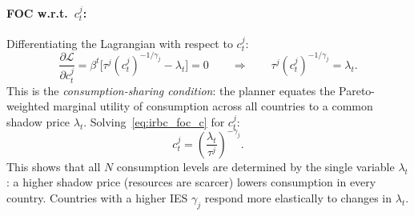 \documentclass[11pt,a4paper]{report}
\begin{document}
\paragraph{FOC w.r.t.\ $c_t^j$:}  Differentiating the Lagrangian with respect to $c_t^j$:
\begin{equation}
\frac{\partial \mathcal{L}}{\partial c_t^j}
= \beta^t \bigl[\tau^j (c_t^j)^{-1/\gamma_j} - \lambda_t\bigr] = 0
\qquad\Longrightarrow\qquad
\tau^j (c_t^j)^{-1/\gamma_j} = \lambda_t.
\label{eq:irbc_foc_c}
\end{equation}
This is the \emph{consumption-sharing condition}: the planner equates the Pareto-weighted marginal utility of consumption across all countries to a common shadow price $\lambda_t$.  Solving~\eqref{eq:irbc_foc_c} for $c_t^j$:
\begin{equation}
c_t^j = \left(\frac{\lambda_t}{\tau^j}\right)^{-\gamma_j}.
\label{eq:irbc_consumption}
\end{equation}
This shows that all $N$ consumption levels are determined by the single variable $\lambda_t$: a higher shadow price (resources are scarcer) lowers consumption in every country.  Countries with a higher IES $\gamma_j$ respond more elastically to changes in $\lambda_t$.
\end{document}
